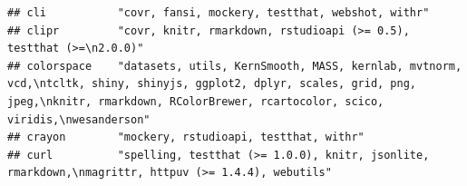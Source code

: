 \documentclass[]{article}
\begin{document}
\begin{verbatim}
## cli           "covr, fansi, mockery, testthat, webshot, withr"                                                                                                                                                                                                                                                                                                                                                                                                                                                                                                                                          
## clipr         "covr, knitr, rmarkdown, rstudioapi (>= 0.5), testthat (>=\n2.0.0)"                                                                                                                                                                                                                                                                                                                                                                                                                                                                                                                       
## colorspace    "datasets, utils, KernSmooth, MASS, kernlab, mvtnorm, vcd,\ntcltk, shiny, shinyjs, ggplot2, dplyr, scales, grid, png, jpeg,\nknitr, rmarkdown, RColorBrewer, rcartocolor, scico, viridis,\nwesanderson"                                                                                                                                                                                                                                                                                                                                                                                   
## crayon        "mockery, rstudioapi, testthat, withr"                                                                                                                                                                                                                                                                                                                                                                                                                                                                                                                                                    
## curl          "spelling, testthat (>= 1.0.0), knitr, jsonlite, rmarkdown,\nmagrittr, httpuv (>= 1.4.4), webutils"                                                                                                                                                                                                                                                                                                                                                                                                                                                                                       

\end{verbatim}
\end{document}
